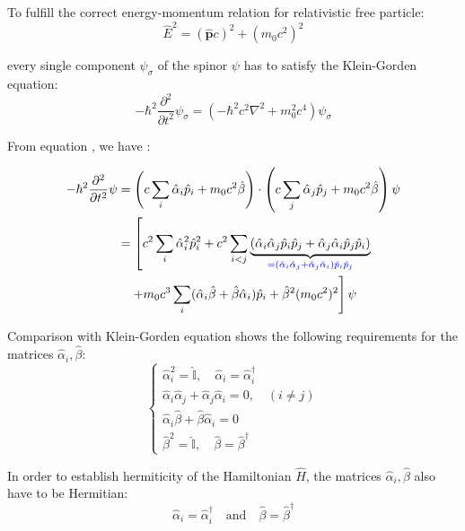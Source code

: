 To fulfill the correct energy-momentum relation for relativistic free particle:
\begin{equation}
\hat{E}^2 = (\hat{\bm{p}}c)^2 + (m_0 c^2)^2
\end{equation}

every single component $\psi_\sigma$ of the spinor $\psi$ has to satisfy the Klein-Gorden equation:
\begin{equation}
-\hbar^2 \frac{\partial^2}{\partial t^2} \psi_\sigma = (-\hbar^2 c^2 \nabla^2 + m_0^2 c^4) \psi_\sigma
\end{equation}

From equation , we have :

\begin{equation}
\begin{aligned}
-\hbar^2 \frac{\partial^2}{\partial t^2} \psi &= \left( c \sum_i \hat{\alpha}_i \hat{p}_i + m_0 c^2 \hat{\beta} \right) \cdot \left( c \sum_j \hat{\alpha}_j \hat{p}_j + m_0 c^2 \hat{\beta} \right) \psi \\
&= \left[ c^2 \sum_i \hat{\alpha}_i^2 \hat{p}_i^2 + c^2 \sum_{i < j} \underbrace{(\hat{\alpha}_i \hat{\alpha}_j \hat{p}_i \hat{p}_j + \hat{\alpha}_j \hat{\alpha}_i \hat{p}_j \hat{p}_i)}_{\textcolor{blue}{= (\hat{\alpha}_i \hat{\alpha}_j + \hat{\alpha}_j \hat{\alpha}_i) \hat{p}_i \hat{p}_j}} \right. \\
&\quad \left. + m_0 c^3 \sum_i (\hat{\alpha}_i \hat{\beta} + \hat{\beta} \hat{\alpha}_i) \hat{p}_i + \hat{\beta}^2 (m_0 c^2)^2 \right] \psi
\end{aligned}
\end{equation}

Comparison with Klein-Gorden equation shows the following requirements for the matrices $\hat{\alpha}_i, \hat{\beta}$:
\begin{equation}
\begin{cases}
\hat{\alpha}_i^2 = \hat{\mathbb{I}}, \quad \hat{\alpha}_i = \hat{\alpha}_i^\dagger \\
\hat{\alpha}_i \hat{\alpha}_j + \hat{\alpha}_j \hat{\alpha}_i = 0, \quad (i \neq j) \\
\hat{\alpha}_i \hat{\beta} + \hat{\beta} \hat{\alpha}_i = 0 \\
\hat{\beta}^2 = \hat{\mathbb{I}}, \quad \hat{\beta} = \hat{\beta}^\dagger
\end{cases}
\end{equation}

In order to establish hermiticity of the Hamiltonian $\hat{H}$, the matrices $\hat{\alpha}_i, \hat{\beta}$ also have to be Hermitian:
\begin{equation}
\hat{\alpha}_i = \hat{\alpha}_i^\dagger \quad \text{and} \quad \hat{\beta} = \hat{\beta}^\dagger
\end{equation}

